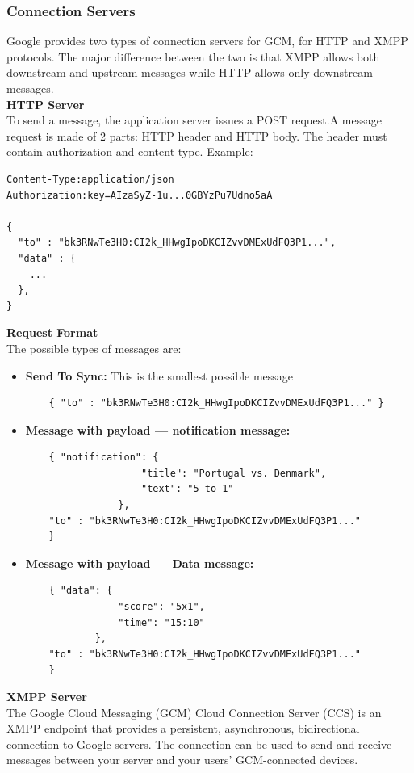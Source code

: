 \subsubsection{Connection Servers}
Google provides two types of connection servers for GCM, for HTTP and XMPP protocols. The major difference between the two is that XMPP allows both downstream and upstream messages while HTTP allows only downstream messages.\\
\textbf{HTTP Server}\\
To send a message, the application server issues a POST request.A message request is made of 2 parts: HTTP header and HTTP body. The header must contain authorization and content-type. Example:\\
\begin{lstlisting}
Content-Type:application/json
Authorization:key=AIzaSyZ-1u...0GBYzPu7Udno5aA

{
  "to" : "bk3RNwTe3H0:CI2k_HHwgIpoDKCIZvvDMExUdFQ3P1...",
  "data" : {
    ...
  },
}
\end{lstlisting}
\small\textbf{Request Format}\\
The possible types of messages are:
\begin{itemize}
	\item \small\textbf{Send To Sync: } This is the smallest possible message
		\begin{lstlisting}
	{ "to" : "bk3RNwTe3H0:CI2k_HHwgIpoDKCIZvvDMExUdFQ3P1..." }
		\end{lstlisting}
	\item \small\textbf{Message with payload — notification message: }
	\begin{lstlisting}
	{ "notification": {
    				"title": "Portugal vs. Denmark",
    				"text": "5 to 1"
  				},
  	"to" : "bk3RNwTe3H0:CI2k_HHwgIpoDKCIZvvDMExUdFQ3P1..."
	}
		\end{lstlisting} 
	\item \small\textbf{Message with payload — Data message: }
	\begin{lstlisting}
	{ "data": {
    			"score": "5x1",
    			"time": "15:10"
  			},
  	"to" : "bk3RNwTe3H0:CI2k_HHwgIpoDKCIZvvDMExUdFQ3P1..."
	}
		\end{lstlisting} 
\end{itemize}
\textbf{XMPP Server}\\
The Google Cloud Messaging (GCM) Cloud Connection Server (CCS) is an XMPP endpoint that provides a persistent, asynchronous, bidirectional connection to Google servers. The connection can be used to send and receive messages between your server and your users' GCM-connected devices.
